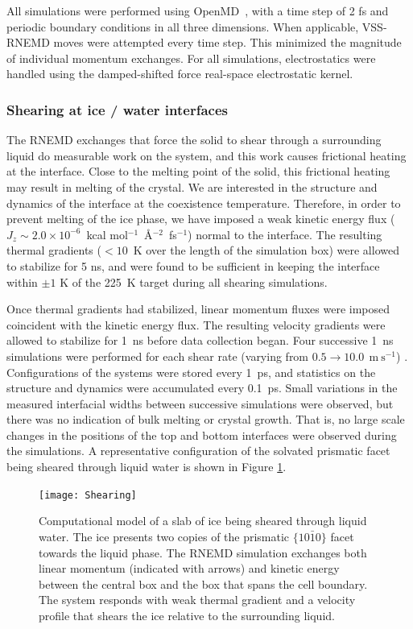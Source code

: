 \documentclass[journal = jpccck, manuscript = article]{achemso}
\begin{document}
All simulations were performed using
OpenMD~\cite{Meineke2005,Gezelter2016}, with a time step of 2 fs and
periodic boundary conditions in all three dimensions. When applicable,
VSS-RNEMD moves were attempted every time step. This minimized the
magnitude of individual momentum exchanges. For all simulations,
electrostatics were handled using the damped-shifted force real-space
electrostatic kernel.\cite{Fennell2006}

\subsubsection{Shearing at ice / water interfaces}
The RNEMD exchanges that force the solid to shear through a
surrounding liquid do measurable work on the system, and this work
causes frictional heating at the interface. Close to the melting point
of the solid, this frictional heating may result in melting of the
crystal.  We are interested in the structure and dynamics of the
interface at the coexistence temperature.  Therefore, in order to
prevent melting of the ice phase, we have imposed a weak kinetic
energy flux ($J_z \sim 2.0\times 10^{-6}$~kcal
mol$^{-1}$~\AA$^{-2}$~fs$^{-1}$) normal to the interface. The
resulting thermal gradients ($< 10$~K over the length of the
simulation box) were allowed to stabilize for 5 ns, and were found to
be sufficient in keeping the interface within $\pm 1$ K of the 225~K
target during all shearing simulations.
 
Once thermal gradients had stabilized, linear momentum fluxes were
imposed coincident with the kinetic energy flux. The resulting
velocity gradients were allowed to stabilize for 1~ns before data
collection began. Four successive 1~ns simulations were performed for
each shear rate (varying from
$0.5 \rightarrow 10.0~\mathrm{~m~s}^{-1}$) . Configurations of the
systems were stored every 1~ps, and statistics on the structure and
dynamics were accumulated every 0.1~ps. Small variations in the
measured interfacial widths between successive simulations were
observed, but there was no indication of bulk melting or crystal
growth.  That is, no large scale changes in the positions of the top
and bottom interfaces were observed during the simulations.  A
representative configuration of the solvated prismatic facet being
sheared through liquid water is shown in Figure \ref{fig:Shearing}.

\begin{figure}
\texttt{[image: Shearing]}
\caption{\label{fig:Shearing} Computational model of a slab of ice
  being sheared through liquid water.  The ice presents two copies of
  the prismatic $\{10\bar{1}0\}$ facet towards the liquid phase.  The
  RNEMD simulation exchanges both linear momentum (indicated with
  arrows) and kinetic energy between the central box and the box that
  spans the cell boundary.  The system responds with weak thermal
  gradient and a velocity profile that shears the ice relative to the
  surrounding liquid.}
\end{figure}
\end{document}
